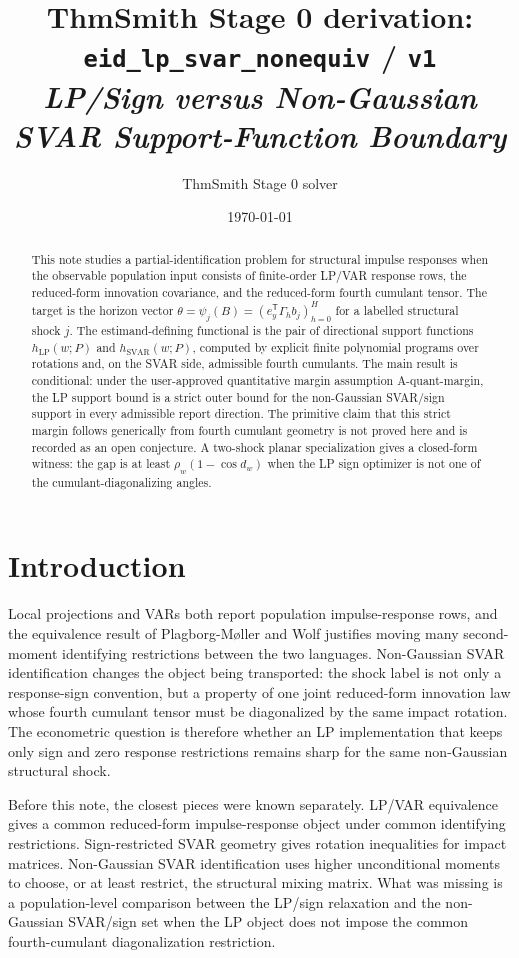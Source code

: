 \documentclass[11pt]{article}
\title{ThmSmith Stage 0 derivation: \texttt{eid\_lp\_svar\_nonequiv} / \texttt{v1}%
  \\ \large\textit{LP/Sign versus Non-Gaussian SVAR Support-Function Boundary}}
\author{ThmSmith Stage 0 solver}
\date{\today}
\newcommand{\transpose}{\mathsf{T}}
\theoremstyle{definition}
\theoremstyle{plain}
\theoremstyle{remark}
\begin{document}
\maketitle


\begin{abstract}
This note studies a partial-identification problem for structural impulse
responses when the observable population input consists of finite-order
LP/VAR response rows, the reduced-form innovation covariance, and the
reduced-form fourth cumulant tensor.  The target is the horizon vector
\(\theta=\psi_j(B)=(e_y^\transpose\Gamma_h b_j)_{h=0}^H\) for a labelled
structural shock \(j\).  The estimand-defining functional is the pair of
directional support functions \(h_{\mathrm{LP}}(w;P)\) and
\(h_{\mathrm{SVAR}}(w;P)\), computed by explicit finite polynomial programs
over rotations and, on the SVAR side, admissible fourth cumulants.  The main
result is conditional: under the user-approved quantitative margin assumption
\textup{A-quant-margin}, the LP support bound is a strict outer bound for the
non-Gaussian SVAR/sign support in every admissible report direction.  The
primitive claim that this strict margin follows generically from fourth
cumulant geometry is not proved here and is recorded as an open conjecture.
A two-shock planar specialization gives a closed-form witness: the gap is at
least \(\rho_w(1-\cos d_w)\) when the LP sign optimizer is not one of the
cumulant-diagonalizing angles.
\end{abstract}

\section{Introduction}
Local projections and VARs both report population impulse-response rows, and
the equivalence result of Plagborg-M{\o}ller and Wolf \cite{PlagborgMollerWolf2021}
justifies moving many second-moment identifying restrictions between the two
languages.  Non-Gaussian SVAR identification changes the object being
transported: the shock label is not only a response-sign convention, but a
property of one joint reduced-form innovation law whose fourth cumulant tensor
must be diagonalized by the same impact rotation.  The econometric question is
therefore whether an LP implementation that keeps only sign and zero response
restrictions remains sharp for the same non-Gaussian structural shock.

Before this note, the closest pieces were known separately.  LP/VAR
equivalence gives a common reduced-form impulse-response object under common
identifying restrictions.  Sign-restricted SVAR geometry gives rotation
inequalities for impact matrices.  Non-Gaussian SVAR identification uses higher
unconditional moments to choose, or at least restrict, the structural mixing
matrix.  What was missing is a population-level comparison between the LP/sign
relaxation and the non-Gaussian SVAR/sign set when the LP object does not impose
the common fourth-cumulant diagonalization restriction.
\end{document}
